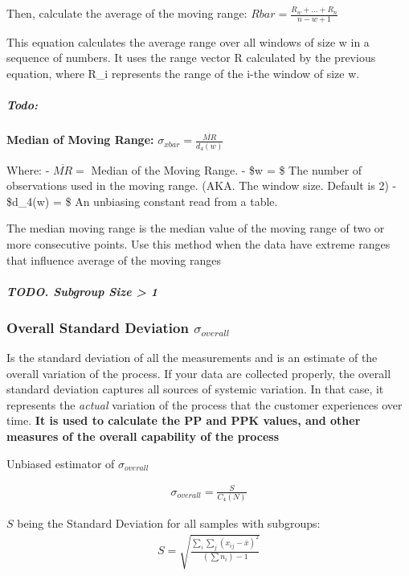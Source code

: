 \documentclass[11pt]{article}
\begin{document}
Then, calculate the average of the moving range:
\(Rbar = \frac{R_w + ... + R_n}{n-w+1}\)

This equation calculates the average range over all windows of size w in
a sequence of numbers. It uses the range vector R calculated by the
previous equation, where R\_i represents the range of the i-the window
of size w.

\hypertarget{todo}{%
\subparagraph{Todo:}\label{todo}}

\textbf{Median of Moving Range:}
\(\sigma_{xbar} = \frac{\overline{MR}}{d_4(w)}\)

Where: - \(\overline{MR} =\) Median of the Moving Range. - \$w = \$ The
number of observations used in the moving range. (AKA. The window size.
Default is 2) - \$d\_4(w) = \$ An unbiasing constant read from a table.

The median moving range is the median value of the moving range of two
or more consecutive points. Use this method when the data have extreme
ranges that influence average of the moving ranges

\hypertarget{todo.-subgroup-size-1}{%
\subparagraph{TODO. Subgroup Size \textgreater{}
1}\label{todo.-subgroup-size-1}}

\hypertarget{overall-standard-deviation-sigma_overall}{%
\subsubsection{Overall Standard Deviation \(\sigma_{overall}\)}\label{overall-standard-deviation-sigma_overall}}
Is the standard deviation of all the measurements and is an
estimate of the overall variation of the process. If your data are
collected properly, the overall standard deviation captures all sources
of systemic variation. In that case, it represents the \emph{actual}
variation of the process that the customer experiences over time.
\textbf{It is used to calculate the PP and PPK values, and other
measures of the overall capability of the process}

Unbiased estimator of \(\sigma_{overall}\)

\begin{gather}
  \sigma_{overall}= \frac{S}{C_4(N)}
\end{gather}

\(S\) being the Standard Deviation for all samples with subgroups:
\begin{gather}
  S = \sqrt{\frac{\sum_i \sum_j (x_{ij} - \bar{x})^2}{(\sum n_i) - 1}}
\end{gather}
\end{document}
